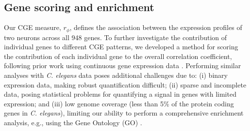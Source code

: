 \documentclass[10pt,letterpaper]{article}
\begin{document}

\subsection*{Gene scoring and enrichment}
Our CGE measure, $r_\phi$, defines the association between the expression profiles of two neurons across all 948 genes.
To further investigate the contribution of individual genes to different CGE patterns, we developed a method for scoring the contribution of each individual gene to the overall correlation coefficient, following prior work using continuous gene expression data \cite{Fulcher:2016ck}.
Performing similar analyses with \emph{C. elegans} data poses additional challenges due to:
(i) binary expression data, making robust quantification difficult;
(ii) sparse and incomplete data, posing statistical problems for quantifying a signal in genes with limited expression;
and (iii) low genome coverage (less than 5\% of the protein coding genes in \emph{C. elegans}), limiting our ability to perform a comprehensive enrichment analysis, e.g., using the Gene Ontology (GO) \cite{Ashburner2000}.

\end{document}
